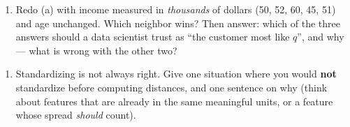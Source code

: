 \documentclass[
  11pt,
]{article}
\providecommand{\tightlist}{%
  \setlength{\itemsep}{0pt}\setlength{\parskip}{0pt}}
\begin{document}
\begin{enumerate}
\def\labelenumi{(\alph{enumi})}
\setcounter{enumi}{2}
\tightlist
\item
  Redo (a) with income measured in \emph{thousands} of dollars (50, 52,
  60, 45, 51) and age unchanged. Which neighbor wins? Then answer: which
  of the three answers should a data scientist trust as ``the customer
  most like \(q\)'', and why --- what is wrong with the other two?
\end{enumerate}

\begin{enumerate}
\def\labelenumi{(\alph{enumi})}
\setcounter{enumi}{3}
\tightlist
\item
  Standardizing is not always right. Give one situation where you would
  \textbf{not} standardize before computing distances, and one sentence
  on why (think about features that are already in the same meaningful
  units, or a feature whose spread \emph{should} count).
\end{enumerate}
\end{document}
